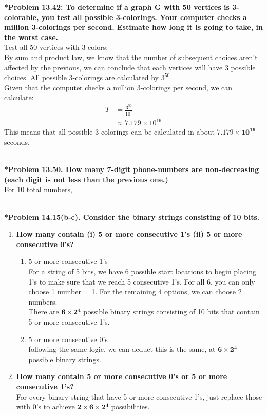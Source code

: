 \documentclass{article}
\begin{document}
    \noindent \textbf{*Problem 13.42: To determine if a graph G with 50 vertices is 3-colorable, you test all possible 3-colorings. Your computer checks a million 3-colorings per second. Estimate how long it is going to take, in the worst case.}
    \\ Test all 50 vertices with 3 colors:
    \\ By sum and product law, we know that the number of subsequent choices aren't affected by the previous, we can conclude that each vertices will have 3 possible choices. All possible 3-colorings are calculated by $3^{50}$
    \\ Given that the computer checks a million 3-colorings per second, we can calculate:
    \begin{align*}
        T &= \frac{3^{50}}{10^7}\\
        & \approx 7.179 \times 10^{16}
    \end{align*}
    \noindent This means that all possible 3 colorings can be calculated in about {\LARGE $\boxed{\mathbf{7.179 \times 10^{16}}}$} seconds.
    
    \noindent\\[0.25in]
    \noindent \textbf{*Problem 13.50. How many 7-digit phone-numbers are non-decreasing (each digit is not less than the previous one.)}
    \\ For 10 total numbers, 
    
    \noindent\\[0.25in]
    \noindent \textbf{*Problem 14.15(b-c). Consider the binary strings consisting of 10 bits.}
    \begin{enumerate}[label=(\alph*)]
        \item \textbf{How many contain (i) 5 or more consecutive 1’s (ii) 5 or more consecutive 0’s?}
        \begin{enumerate}[label=(\roman*)]
            \item 5 or more consecutive 1's
            \\ For a string of 5 bits, we have 6 possible start locations to begin placing 1's to make 
            sure that we reach 5 consecutive 1's. For all 6, you can only choose 1 number = 1. For the 
            remaining 4 options, we can choose 2 numbers.
            \\ There are $\mathbf{6 \times 2^4}$ possible binary strings consisting of 10 bits that contain 5 
            or more consecutive 1's.
            \item 5 or more consecutive 0's
            \\ following the same logic, we can deduct this is the same, at $\mathbf{6 \times 2^4}$
            possible binary strings.
        \end{enumerate}
        \item \textbf{How many contain 5 or more consecutive 0’s or 5 or more consecutive 1’s?}
        \\ For every binary string that have 5 or more consecutive 1's, just replace those with 0's
        to achieve {\LARGE $\boxed{\mathbf{2 \times 6 \times 2^4}}$} possibilities.
    \end{enumerate}
\end{document}

